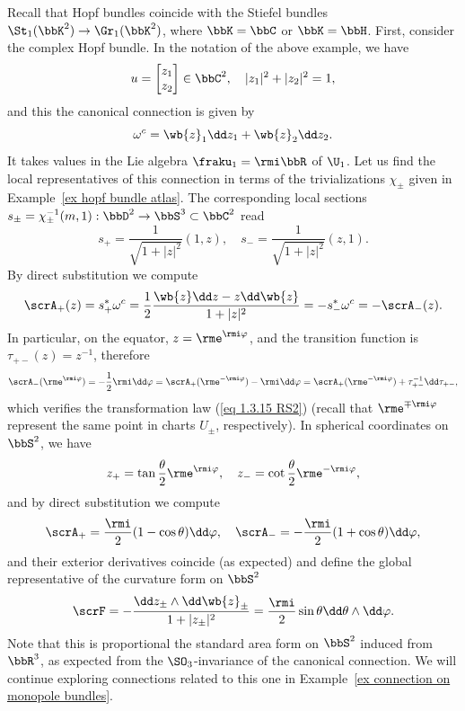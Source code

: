\begin{example}\label{ex connection on Hopf bundle}
    Recall that Hopf bundles coincide with the Stiefel bundles $\St_1(\bbK^2)\to \Gr_1(\bbK^2)$, where $\bbK=\bbC$ or $\bbK=\bbH$. First, consider the complex Hopf bundle. In the notation of the above example, we have
    \[u=\begin{bmatrix}
        z_1\\z_2
    \end{bmatrix}
    \in\bbC^2,\quad |z_1|^2+|z_2|^2=1,\]
    and this the canonical connection is given by
    \[\omega^c=\wb{z}_1\dd z_1+\wb{z}_2\dd z_2.\]
    It takes values in the Lie algebra $\fraku_1=\rmi \bbR$ of $\U_1$. Let us find the local representatives of this connection in terms of the trivializations $\chi_\pm$ given in Example~\ref{ex hopf bundle atlas}. The corresponding local sections $s_\pm=\chi^{-1}_\pm(m,1):\bbD^2\to \bbS^3\subset\bbC^2$ read
    \[s_+=\frac{1}{\sqrt{1+|z|^2}}(1,z),\quad s_-=\frac{1}{\sqrt{1+|z|^2}}(z,1).\]
    By direct substitution we compute
    \[\scrA_+(z)=s_+^\ast \omega^c=\frac12\frac{\wb{z}\dd z-z\dd \wb{z}}{1+|z|^2}=-s_-^\ast\omega^c=-\scrA_-(z).\]
    In particular, on the equator, $z=\rme^{\rmi \varphi}$, and the transition function is $\tau_{+-}(z)=z^{-1}$, therefore
    \[\scrA_-(\rme^{\rmi \varphi})=-\frac12\rmi \dd\varphi=\scrA_+(\rme^{-\rmi \varphi})-\rmi\dd\varphi=\scrA_+(\rme^{-\rmi \varphi})+\tau_{+-}^{-1}\dd\tau_{+-},\]
    which verifies the transformation law (\ref{eq 1.3.15 RS2}) (recall that $\rme^{\mp\rmi \varphi}$ represent the same point in charts $U_\pm$, respectively). In spherical coordinates on $\bbS^2$, we have \[z_+=\tan\frac{\theta}{2}\rme^{\rmi\varphi}, \quad z_-=\cot\frac{\theta}{2}\rme^{-\rmi\varphi},\]
    and by direct substitution we compute
    \[\scrA_+=\frac{\rmi}{2}(1-\cos\theta)\dd\varphi,\quad \scrA_-=-\frac{\rmi}{2}(1+\cos\theta)\dd\varphi,\]
    and their exterior derivatives coincide (as expected) and define the global representative of the curvature form on $\bbS^2$
    \[\scrF=-\frac{\dd z_\pm\wedge \dd\wb{z}_\pm}{1+|z_\pm|^2}=\frac{\rmi}{2}\sin\theta \dd\theta\wedge\dd\varphi.\]
    Note that this is proportional the standard area form on $\bbS^2$ induced from $\bbR^3$, as expected from the $\SO_3$-invariance of the canonical connection.
    We will continue exploring connections related to this one in Example~\ref{ex connection on monopole bundles}.


\end{example}
